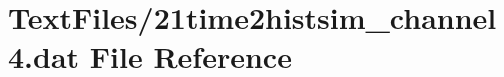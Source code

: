 \hypertarget{21time2histsim__channel4_8dat}{}\section{Text\+Files/21time2histsim\+\_\+channel4.dat File Reference}
\label{21time2histsim__channel4_8dat}
